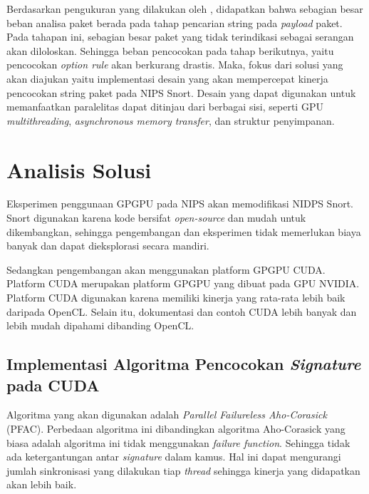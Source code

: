     Berdasarkan pengukuran yang dilakukan oleh \textcite{kargus2012}, didapatkan bahwa sebagian besar beban analisa paket berada pada tahap pencarian string pada \emph{payload} paket. Pada tahapan ini, sebagian besar paket yang tidak terindikasi sebagai serangan akan diloloskan. Sehingga beban pencocokan pada tahap berikutnya, yaitu pencocokan \emph{option rule} akan berkurang drastis. Maka, fokus dari solusi yang akan diajukan yaitu implementasi desain yang akan mempercepat kinerja pencocokan string paket pada NIPS Snort. Desain yang dapat digunakan untuk memanfaatkan paralelitas dapat ditinjau dari berbagai sisi, seperti GPU \emph{multithreading}, \emph{asynchronous memory transfer}, dan struktur penyimpanan.

  \section{Analisis Solusi}
  

    Eksperimen penggunaan GPGPU pada NIPS akan memodifikasi NIDPS Snort. Snort digunakan karena kode bersifat \emph{open-source} dan mudah untuk dikembangkan, sehingga pengembangan dan eksperimen tidak memerlukan biaya banyak dan dapat dieksplorasi secara mandiri. 

    Sedangkan pengembangan akan menggunakan platform GPGPU CUDA. Platform CUDA merupakan platform GPGPU yang dibuat pada GPU NVIDIA. Platform CUDA digunakan karena memiliki kinerja yang rata-rata lebih baik daripada OpenCL. Selain itu, dokumentasi dan contoh CUDA lebih banyak dan lebih mudah dipahami dibanding OpenCL.

    \subsection{Implementasi Algoritma Pencocokan \emph{Signature} pada CUDA}

      Algoritma yang akan digunakan adalah \emph{Parallel Failureless Aho-Corasick} (PFAC). Perbedaan algoritma ini dibandingkan algoritma Aho-Corasick yang biasa adalah algoritma ini tidak menggunakan \emph{failure function}. Sehingga tidak ada ketergantungan antar \emph{signature} dalam kamus. Hal ini dapat mengurangi jumlah sinkronisasi yang dilakukan tiap \emph{thread} sehingga kinerja yang didapatkan akan lebih baik. 

